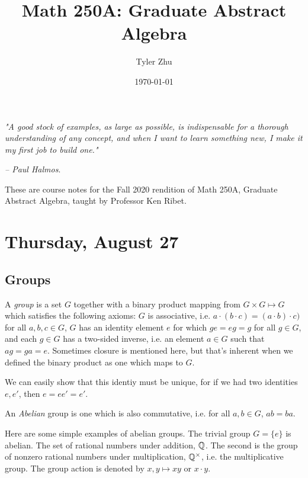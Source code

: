\documentclass[11 pt]{scrartcl}
\begin{document}
 
\title{\Large Math 250A: Graduate Abstract Algebra}
\author{\large Tyler Zhu}
\date{\large\today}

\maketitle 

\begin{center}
\begin{displayquote}
    \emph{"A good stock of examples, as large as possible, is indispensable for a thorough understanding of any concept, and when I want to learn something new, I make it my first job to build one."} \\ \begin{flushright} \emph{– Paul Halmos}.  \end{flushright}
\end{displayquote}
\end{center}


These are course notes for the Fall 2020 rendition of Math 250A, Graduate Abstract Algebra, taught by Professor Ken Ribet.

\tableofcontents 

\newpage

\section{Thursday, August 27}
\subsection{Groups}
A \emph{group} is a set $G$ together with a binary product mapping from $G\times G \mapsto G$ which satisfies the following axioms: 
\itemnum
    \ii $G$ is associative, i.e. $a\cdot (b\cdot c) = (a\cdot b)\cdot c)$ for all $a,b,c\in G$, 
    \ii $G$ has an identity element $e$ for which $ge =  eg = g$ for all $g\in G$, and 
    \ii each $g\in G$ has a two-sided inverse, i.e. an element $a\in G$ such that $ag = ga = e$. 
\itemend
Sometimes closure is mentioned here, but that's inherent when we defined the binary product as one which maps to $G$. 

We can easily show that this identiy must be unique, for if we had two identities $e, e'$, then $e = ee' = e'$. 

An \emph{Abelian} group is one which is also commutative, i.e. for all $a,b\in G$, $ab = ba$. 

\begin{example}
    Here are some simple examples of abelian groups. 
\itemnum
    \ii The trivial group $G = \{e\}$ is abelian. 
    \ii The set of rational numbers under addition, $\mathbb Q$. 
    \ii The second is the group of nonzero rational numbers under multiplication, $\mathbb Q^\times$, i.e. the multiplicative group. The group action is denoted by $x,y\mapsto xy$ or $x\cdot y$.  
\itemend
\end{example}
\end{document}
